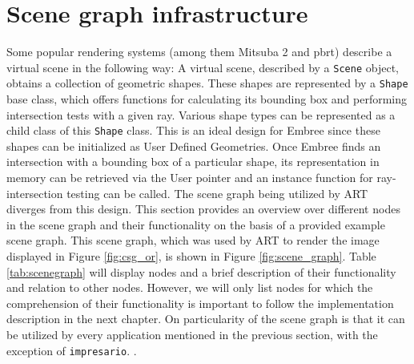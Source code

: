 \section{Scene graph infrastructure}
Some popular rendering systems (among them Mitsuba 2 and pbrt) describe a virtual scene in the following way: A virtual scene, described by a \texttt{Scene} object, obtains a collection of geometric shapes. These shapes are represented by a \texttt{Shape} base class, which offers functions for calculating its bounding box and performing intersection tests with a given ray. Various shape types can be represented as a child class of this \texttt{Shape} class. This is an ideal design for Embree since these shapes can be initialized as User Defined Geometries. Once Embree finds an intersection with a bounding box of a particular shape, its representation in memory can be retrieved via the User pointer  and an instance function for ray-intersection testing can be called. 
The scene graph being utilized by ART diverges from this design. This section provides an overview over different nodes in the scene graph and their functionality on the basis of a provided example scene graph. This scene graph, which was used by ART to render the image displayed in Figure \ref{fig:csg_or}, is shown in Figure \ref{fig:scene_graph}. Table \ref{tab:scenegraph} will display nodes and a brief description of their functionality and relation to other nodes. However, we will only list nodes for which the comprehension of their functionality is important to follow the implementation description in the next chapter.
On particularity of the scene graph is that it can be utilized by every application mentioned in the previous section, with the exception of \texttt{impresario}. . 



